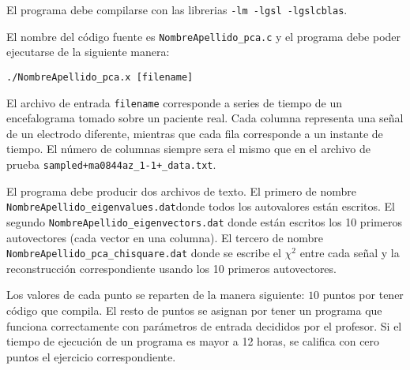 \documentclass{article}
\begin{document}
\begin{enumerate}
El programa debe compilarse con las librerias \verb"-lm -lgsl -lgslcblas".

El nombre del c\'odigo fuente es \verb"NombreApellido_pca.c" y el
programa debe poder ejecutarse de la siguiente manera: 

\begin{verbatim}
./NombreApellido_pca.x [filename]
\end{verbatim}

El archivo de entrada \verb"filename" corresponde a series de tiempo
de un encefalograma tomado sobre un paciente real. Cada columna
representa una se\~nal de un electrodo diferente, mientras que cada
fila corresponde a un instante de tiempo. El n\'umero de columnas
siempre sera el mismo que en el archivo de prueba   \verb"sampled+ma0844az_1-1+_data.txt".  

El programa debe producir dos archivos de texto. El primero de nombre
\verb"NombreApellido_eigenvalues.dat"donde todos los autovalores
est\'an escritos. El segundo \verb"NombreApellido_eigenvectors.dat"
donde est\'an escritos los 10 primeros autovectores (cada vector en una
columna). El tercero de nombre
\verb"NombreApellido_pca_chisquare.dat" donde se escribe el $\chi^2$
entre cada se\~nal y la reconstrucci\'on correspondiente usando los 10
primeros autovectores.


\end{enumerate}

Los valores de cada punto se reparten de la manera siguiente: $10$
puntos por tener c\'odigo que compila. El resto de puntos se asignan
por tener un programa que funciona correctamente con par\'ametros de
entrada decididos por el profesor. Si el tiempo de ejecuci\'on de un
programa es mayor a 12 horas, se califica con cero puntos el ejercicio
correspondiente. 
\end{document}

